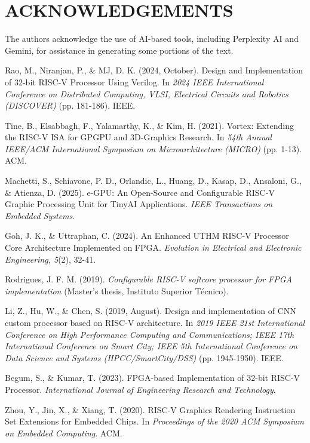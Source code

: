 \documentclass[a4paper,twoside]{article}
\begin{document}
\section*{\uppercase{Acknowledgements}}

The authors acknowledge the use of AI-based tools, including Perplexity AI and Gemini, for assistance in generating some portions of the text. 

\begin{thebibliography}{99}

Rao, M., Niranjan, P., \& MJ, D. K. (2024, October). Design and Implementation of 32-bit RISC-V Processor Using Verilog. In \textit{2024 IEEE International Conference on Distributed Computing, VLSI, Electrical Circuits and Robotics (DISCOVER)} (pp. 181-186). IEEE.

Tine, B., Elsabbagh, F., Yalamarthy, K., \& Kim, H. (2021). Vortex: Extending the RISC-V ISA for GPGPU and 3D-Graphics Research. In \textit{54th Annual IEEE/ACM International Symposium on Microarchitecture (MICRO)} (pp. 1-13). ACM.

Machetti, S., Schiavone, P. D., Orlandic, L., Huang, D., Kasap, D., Ansaloni, G., \& Atienza, D. (2025). e-GPU: An Open-Source and Configurable RISC-V Graphic Processing Unit for TinyAI Applications. \textit{IEEE Transactions on Embedded Systems}.

Goh, J. K., \& Uttraphan, C. (2024). An Enhanced UTHM RISC-V Processor Core Architecture Implemented on FPGA. \textit{Evolution in Electrical and Electronic Engineering, 5}(2), 32-41.

Rodrigues, J. F. M. (2019). \textit{Configurable RISC-V softcore processor for FPGA implementation} (Master's thesis, Instituto Superior Técnico).

Li, Z., Hu, W., \& Chen, S. (2019, August). Design and implementation of CNN custom processor based on RISC-V architecture. In \textit{2019 IEEE 21st International Conference on High Performance Computing and Communications; IEEE 17th International Conference on Smart City; IEEE 5th International Conference on Data Science and Systems (HPCC/SmartCity/DSS)} (pp. 1945-1950). IEEE.

Begum, S., \& Kumar, T. (2023). FPGA-based Implementation of 32-bit RISC-V Processor. \textit{International Journal of Engineering Research and Technology}.

Zhou, Y., Jin, X., \& Xiang, T. (2020). RISC-V Graphics Rendering Instruction Set Extensions for Embedded Chips. In \textit{Proceedings of the 2020 ACM Symposium on Embedded Computing}. ACM.


\end{thebibliography}
\end{document}
